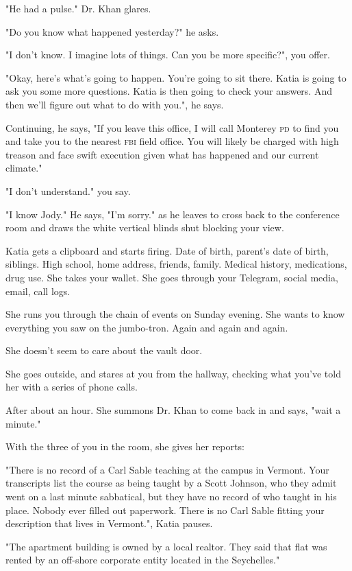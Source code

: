 \documentclass[a5paper, symmetric]{tufte-book}
\begin{document}
"He had a pulse." Dr. Khan glares. 

"Do you know what happened yesterday?" he asks. 

"I don't know. I imagine lots of things. Can you be more specific?", you offer. 

"Okay, here's what's going to happen. You're going to sit there. Katia is going to ask you some more questions. Katia is then going to check your answers. And then we'll figure out what to do with you.", he says. 

Continuing, he says, "If you leave this office, I will call Monterey \textsc{pd} to find you and take you to the nearest \textsc{fbi} field office. You will likely be charged with high treason and face swift execution given what has happened and our current climate." 

"I don't understand." you say. 

"I know Jody." He says, "I'm sorry." as he leaves to cross back to the conference room and draws the white vertical blinds shut blocking your view.

Katia gets a clipboard and starts firing. Date of birth, parent's date of birth, siblings. High school, home address, friends, family. Medical history, medications, drug use. She takes your wallet. She goes through your Telegram, social media, email, call logs. 

She runs you through the chain of events on Sunday evening. She wants to know everything you saw on the jumbo-tron. Again and again and again. 

She doesn't seem to care about the vault door. 

She goes outside, and stares at you from the hallway, checking what you've told her with a series of phone calls. 

After about an hour. She summons Dr. Khan to come back in and says, "wait a minute."

With the three of you in the room, she gives her reports: 

"There is no record of a Carl Sable teaching at the campus in Vermont. Your transcripts list the course as being taught by a Scott Johnson, who they admit went on a last minute sabbatical, but they have no record of who taught in his place. Nobody ever filled out paperwork. There is no Carl Sable fitting your description that lives in Vermont.", Katia pauses. 

"The apartment building is owned by a local realtor. They said that flat was rented by an off-shore corporate entity located in the Seychelles."
\end{document}
